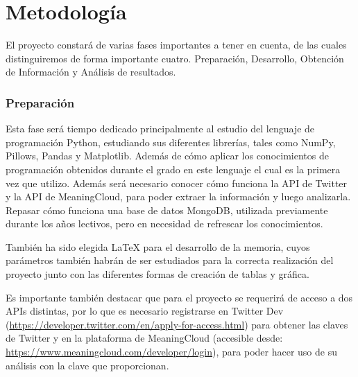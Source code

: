 
\chapter{Metodología}

El proyecto constará de varias fases importantes a tener en cuenta, de las cuales distinguiremos de forma importante cuatro. Preparación, Desarrollo, Obtención de Información y Análisis de resultados. 

\subsection{Preparación}

Esta fase será tiempo dedicado principalmente al estudio del lenguaje de programación Python, estudiando sus diferentes librerías, tales como NumPy\cite{Numpy}, Pillows\cite{Pillow}, Pandas\cite{Pandas} y Matplotlib\cite{Hunter:2007}. Además de cómo aplicar los conocimientos de programación obtenidos durante el grado en este lenguaje el cual es la primera vez que utilizo. Además será necesario conocer cómo funciona la API de Twitter y la API de MeaningCloud\cite{MeaningCloud}, para poder extraer la información y luego analizarla. Repasar cómo funciona una base de datos MongoDB\cite{MongoDB}, utilizada previamente durante los años lectivos, pero en necesidad de refrescar los conocimientos. 

También ha sido elegida LaTeX\cite{goossens93} para el desarrollo de la memoria, cuyos parámetros también habrán de ser estudiados para la correcta realización del proyecto junto con las diferentes formas de creación de tablas y gráfica. 

Es importante también destacar que para el proyecto se requerirá de acceso a dos APIs distintas, por lo que es necesario registrarse en Twitter Dev (\href{https://developer.twitter.com/en/apply-for-access.html}{https://developer.twitter.com/en/apply-for-access.html})  para obtener las claves de Twitter y en la plataforma de MeaningCloud (accesible desde: \href{https://www.meaningcloud.com/developer/login}{https://www.meaningcloud.com/developer/login}), para poder hacer uso de su análisis con la clave que proporcionan.

